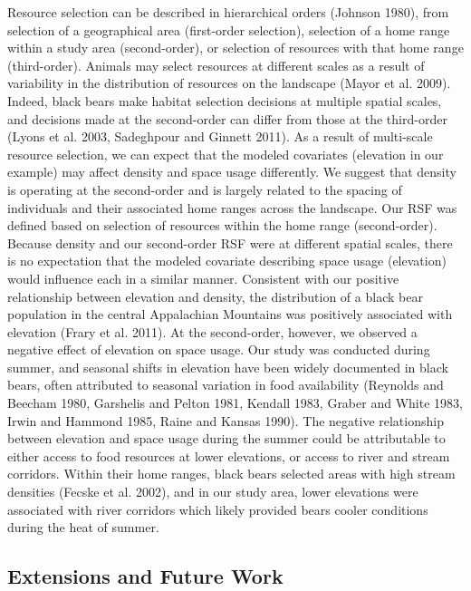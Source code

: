 \documentclass[12pt]{article}
\begin{document}
Resource selection can be described in
hierarchical orders (Johnson 1980), from selection of a geographical
area (first-order selection), selection of a home range within a study
area (second-order), or selection of resources with that home range
(third-order).  Animals may select resources at different scales as a
result of variability in the distribution of resources on the
landscape (Mayor et al. 2009).  Indeed, black bears make habitat
selection decisions at multiple spatial scales, and decisions made at
the second-order can differ from those at the third-order (Lyons et
al. 2003, Sadeghpour and Ginnett 2011).  As a result of multi-scale
resource selection, we can expect that the modeled covariates
(elevation in our example) may affect density and space usage
differently.  We suggest that density is operating at the second-order
and is largely related to the spacing of individuals and their
associated home ranges across the landscape.  Our RSF was defined
based on selection of resources within the home range (second-order).
Because density and our second-order RSF were at different spatial
scales, there is no expectation that the modeled covariate describing
space usage (elevation) would influence each in a similar manner.
Consistent with our positive relationship between elevation and
density, the distribution of a black bear population in the central
Appalachian Mountains was positively associated with elevation (Frary
et al. 2011).  At the second-order, however, we observed a negative
effect of elevation on space usage.  Our study was conducted during
summer, and seasonal shifts in elevation have been widely documented
in black bears, often attributed to seasonal variation in food
availability (Reynolds and Beecham 1980, Garshelis and Pelton 1981,
Kendall 1983, Graber and White 1983, Irwin and Hammond 1985, Raine and
Kansas 1990).  The negative relationship between elevation and space
usage during the summer could be attributable to either access to food
resources at lower elevations, or access to river and stream
corridors.  Within their home ranges, black bears selected areas with
high stream densities (Fecske et al. 2002), and in our study area,
lower elevations were associated with river corridors which likely
provided bears cooler conditions during the heat of summer. 




\subsection{Extensions and Future Work}
\end{document}
